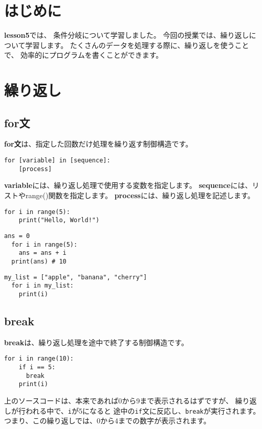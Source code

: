 \documentclass[a4paper,titlepage,dvipdfmx]{jarticle}
\begin{document}
\section{はじめに}
\textbf{lesson5}では、
条件分岐について学習しました。
今回の授業では、繰り返しについて学習します。
たくさんのデータを処理する際に、繰り返しを使うことで、
効率的にプログラムを書くことができます。

\section{繰り返し}
\subsection{for文}
\textbf{for文}は、指定した回数だけ処理を繰り返す制御構造です。
\begin{lstlisting}[caption=for文の構文]
  for [variable] in [sequence]:
    [process]
\end{lstlisting}
\textbf{variable}には、繰り返し処理で使用する変数を指定します。
\textbf{sequence}には、リストやrange()関数を指定します。
\textbf{process}には、繰り返し処理を記述します。

\begin{lstlisting}[caption=5回Hello，World!を表示する例,label=helloloop]
  for i in range(5):
    print("Hello, World!")
\end{lstlisting}

\begin{lstlisting}[caption=5回足し算を行う例,label=plusloop]
  ans = 0
  for i in range(5):
    ans = ans + i
  print(ans) # 10
\end{lstlisting}

\begin{lstlisting}[caption=リストの中身を表示する例,label=listloop]
  my_list = ["apple", "banana", "cherry"]
  for i in my_list:
    print(i)
\end{lstlisting}

\subsection{break}
\textbf{break}は、繰り返し処理を途中で終了する制御構造です。
\begin{lstlisting}[caption=breakの例,label=break]
  for i in range(10):
    if i == 5:
      break
    print(i)
\end{lstlisting}
上のソースコードは、本来であれば0から9まで表示されるはずですが、
繰り返しが行われる中で、\texttt{i}が5になると
途中の\texttt{if}文に反応し、\texttt{break}が実行されます。
つまり、この繰り返しでは、0から4までの数字が表示されます。
\end{document}
